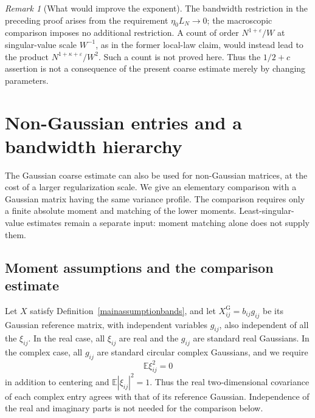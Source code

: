 \documentclass[11pt,reqno]{amsart}
\numberwithin{equation}{section}
\theoremstyle{plain}
\theoremstyle{definition}
\theoremstyle{remark}
\newtheorem{remark}[theorem]{Remark}
\begin{document}
\begin{remark}[What would improve the exponent]
The bandwidth restriction in the preceding proof arises from the
requirement $\eta_0L_N\to0$; the macroscopic comparison imposes no
additional restriction. A count of order $N^{1+\varepsilon}/W$ at singular-value scale
$W^{-1}$, as in the former local-law claim, would instead lead to the
product $N^{1+\kappa+\varepsilon}/W^2$. Such a count is not proved here.
Thus the $1/2+c$ assertion is not a consequence of the present coarse
estimate merely by changing parameters.
\end{remark}

\section{Non-Gaussian entries and a bandwidth hierarchy}\label{sec:nongaussian}

The Gaussian coarse estimate can also be used for non-Gaussian matrices,
at the cost of a larger regularization scale.  We give an elementary
comparison with a Gaussian matrix having the same variance profile.
The comparison requires only a finite absolute moment and matching of
the lower moments.  Least-singular-value estimates remain a separate
input: moment matching alone does not supply them.

\subsection{Moment assumptions and the comparison estimate}

Let $X$ satisfy Definition~\ref{mainassumptionbands}, and let
$X^{\mathrm G}_{ij}=b_{ij}g_{ij}$ be its Gaussian reference matrix, with
independent variables $g_{ij}$, also independent of all the $\xi_{ij}$.
In the real case, all $\xi_{ij}$ are real and the $g_{ij}$ are standard
real Gaussians.  In the complex case, all $g_{ij}$ are standard circular
complex Gaussians, and we require
\begin{equation}\label{eq:moment-complex-covariance}
 \mathbb E\xi_{ij}^2=0
\end{equation}
in addition to centering and $\mathbb E|\xi_{ij}|^2=1$.  Thus the real
two-dimensional covariance of each complex entry agrees with that of
its reference Gaussian.  Independence of the real and imaginary parts
is not needed for the comparison below.
\end{document}
